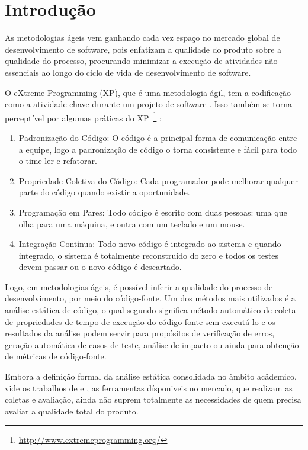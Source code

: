 \chapter{Introdução}

As metodologias ágeis vem ganhando cada vez espaço no mercado global 
de desenvolvimento de software, pois enfatizam a qualidade do produto 
sobre a qualidade do processo, procurando minimizar a execução 
de atividades não essenciais ao longo do ciclo de vida de 
desenvolvimento de software. 

O eXtreme Programming (XP), que é uma metodologia ágil, tem a codificação como a atividade chave durante um projeto de software \cite{beck1999}. Isso também se torna perceptível por algumas práticas do XP~\footnote{\url{http://www.extremeprogramming.org/}} :

\begin{enumerate}
\item Padronização do Código: O código é a principal forma de comunicação entre a equipe, logo a padronização de código o torna consistente e fácil para todo o time ler e refatorar. 
\item Propriedade Coletiva do Código: Cada programador pode melhorar qualquer parte do código quando existir a oportunidade.
\item Programação em Pares: Todo código é escrito com duas pessoas: uma que olha para uma máquina, e outra com um teclado e um mouse.
\item Integração Contínua: Todo novo código é integrado ao sistema e quando integrado, o sistema é totalmente reconstruído do zero e todos os testes devem passar ou o novo código é descartado.
\end{enumerate} 


Logo, em metodologias ágeis, é possível inferir a qualidade do processo de desenvolvimento, por meio do código-fonte. Um dos métodos mais utilizados é a análise estática de código, o qual segundo  significa método automático de coleta de propriedades de tempo de execução do código-fonte sem executá-lo e os resultados da análise podem servir para propósitos de verificação de erros, geração automática de casos de teste, análise de impacto ou ainda para obtenção de métricas de código-fonte.

Embora a definição formal da análise estática consolidada no âmbito acâdemico, vide os trabalhos de \cite{Wichmann95} e \cite{Nielson:1999}, as ferramentas dísponiveis no mercado, que realizam as coletas e avaliação, ainda não suprem totalmente as necessidades de quem precisa avaliar a qualidade total do produto.

